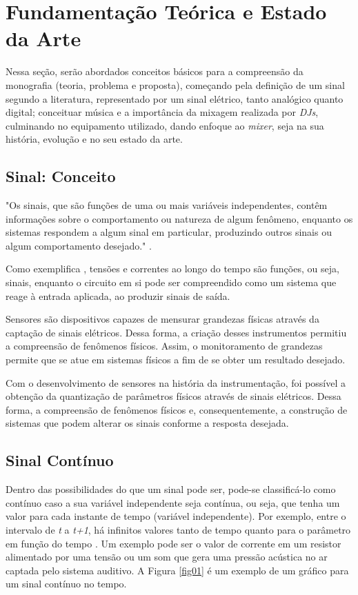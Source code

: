 \chapter[Fundamentação Teórica e Estado da Arte]{Fundamentação Teórica e Estado da Arte}
\label{cha:fundamentacao}
Nessa seção, serão abordados conceitos básicos para a compreensão da monografia (teoria, problema e proposta), começando pela definição de um sinal segundo a literatura, representado por um sinal elétrico, tanto analógico quanto digital; conceituar música e a importância da mixagem realizada por \textit{DJs}, culminando no equipamento utilizado, dando enfoque ao \textit{mixer}, seja na sua história, evolução e no seu estado da arte.

\section{Sinal: Conceito}

\begin{citacao}
"Os sinais, que são funções de uma ou mais variáveis independentes, contêm informações sobre o comportamento ou natureza de algum fenômeno, enquanto os sistemas respondem a algum sinal em particular, produzindo outros sinais ou algum comportamento desejado." \cite{oppenheim2010sinais}.
\end{citacao}

Como exemplifica \cite{oppenheim2010sinais}, tensões e correntes ao longo do tempo são funções, ou seja, sinais, enquanto o circuito em si pode ser compreendido como um sistema que reage à entrada aplicada, ao produzir sinais de saída.

Sensores são dispositivos capazes de mensurar grandezas físicas através da captação de sinais elétricos. Dessa forma, a criação desses instrumentos permitiu a compreensão de fenômenos físicos. Assim, o monitoramento de grandezas permite que se atue em sistemas físicos a fim de se obter um resultado desejado.

Com o desenvolvimento de sensores na história da instrumentação, foi possível a obtenção da quantização de parâmetros físicos através de sinais elétricos. Dessa forma, a compreensão de fenômenos físicos e, consequentemente, a construção de sistemas que podem alterar os sinais conforme a resposta desejada.

\section{Sinal Contínuo}
Dentro das possibilidades do que um sinal pode ser, pode-se classificá-lo como contínuo caso a sua variável independente seja contínua, ou seja, que tenha um valor para cada instante de tempo (variável independente). Por exemplo, entre o intervalo de \textit{t} a \textit{t+1}, há infinitos valores tanto de tempo quanto para o parâmetro em função do tempo \cite{oppenheim2010sinais}. Um exemplo pode ser o valor de corrente em um resistor alimentado por uma tensão ou um som que gera uma pressão acústica no ar captada pelo sistema auditivo. A Figura \ref{fig01} é um exemplo de um gráfico para um sinal contínuo no tempo. 

